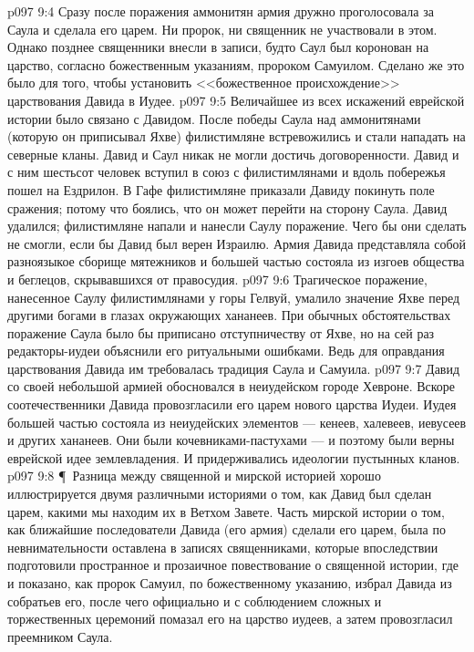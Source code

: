 \vs p097 9:4 Сразу после поражения аммонитян армия дружно проголосовала за Саула и сделала его царем. Ни пророк, ни священник не участвовали в этом. Однако позднее священники внесли в записи, будто Саул был коронован на царство, согласно божественным указаниям, пророком Самуилом. Сделано же это было для того, чтобы установить <<божественное происхождение>> царствования Давида в Иудее.
\vs p097 9:5 Величайшее из всех искажений еврейской истории было связано с Давидом. После победы Саула над аммонитянами (которую он приписывал Яхве) филистимляне встревожились и стали нападать на северные кланы. Давид и Саул никак не могли достичь договоренности. Давид и с ним шестьсот человек вступил в союз с филистимлянами и вдоль побережья пошел на Ездрилон. В Гафе филистимляне приказали Давиду покинуть поле сражения; потому что боялись, что он может перейти на сторону Саула. Давид удалился; филистимляне напали и нанесли Саулу поражение. Чего бы они сделать не смогли, если бы Давид был верен Израилю. Армия Давида представляла собой разноязыкое сборище мятежников и большей частью состояла из изгоев общества и беглецов, скрывавшихся от правосудия.
\vs p097 9:6 Трагическое поражение, нанесенное Саулу филистимлянами у горы Гелвуй, умалило значение Яхве перед другими богами в глазах окружающих хананеев. При обычных обстоятельствах поражение Саула было бы приписано отступничеству от Яхве, но на сей раз редакторы\hyp{}иудеи объяснили его ритуальными ошибками. Ведь для оправдания царствования Давида им требовалась традиция Саула и Самуила.
\vs p097 9:7 Давид со своей небольшой армией обосновался в неиудейском городе Хевроне. Вскоре соотечественники Давида провозгласили его царем нового царства Иудеи. Иудея большей частью состояла из неиудейских элементов --- кенеев, халевеев, иевусеев и других хананеев. Они были кочевниками\hyp{}пастухами --- и поэтому были верны еврейской идее землевладения. И придерживались идеологии пустынных кланов.
\vs p097 9:8 \P\ Разница между священной и мирской историей хорошо иллюстрируется двумя различными историями о том, как Давид был сделан царем, какими мы находим их в Ветхом Завете. Часть мирской истории о том, как ближайшие последователи Давида (его армия) сделали его царем, была по невнимательности оставлена в записях священниками, которые впоследствии подготовили пространное и прозаичное повествование о священной истории, где и показано, как пророк Самуил, по божественному указанию, избрал Давида из собратьев его, после чего официально и с соблюдением сложных и торжественных церемоний помазал его на царство иудеев, а затем провозгласил преемником Саула.
